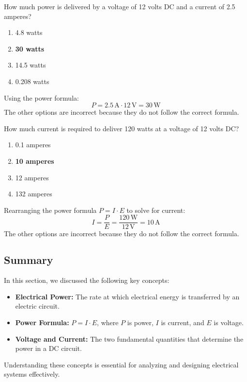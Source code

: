 
\begin{tcolorbox}[colback=gray!10!white,colframe=black!75!black,title={T5C10}]
    How much power is delivered by a voltage of 12 volts DC and a current of 2.5 amperes?
    \begin{enumerate}[label=\Alph*,noitemsep]
        \item 4.8 watts
        \item \textbf{30 watts}
        \item 14.5 watts
        \item 0.208 watts
    \end{enumerate}
\end{tcolorbox}
Using the power formula:
\[
P = 2.5 \, \text{A} \cdot 12 \, \text{V} = 30 \, \text{W}
\]
The other options are incorrect because they do not follow the correct formula.


\begin{tcolorbox}[colback=gray!10!white,colframe=black!75!black,title={T5C11}]
    How much current is required to deliver 120 watts at a voltage of 12 volts DC?
    \begin{enumerate}[label=\Alph*,noitemsep]
        \item 0.1 amperes
        \item \textbf{10 amperes}
        \item 12 amperes
        \item 132 amperes
    \end{enumerate}
\end{tcolorbox}
Rearranging the power formula \( P = I \cdot E \) to solve for current:
\[
I = \frac{P}{E} = \frac{120 \, \text{W}}{12 \, \text{V}} = 10 \, \text{A}
\]
The other options are incorrect because they do not follow the correct formula.


\subsection*{Summary}
In this section, we discussed the following key concepts:
\begin{itemize}
    \item \textbf{Electrical Power:} The rate at which electrical energy is transferred by an electric circuit.
    \item \textbf{Power Formula:} \( P = I \cdot E \), where \( P \) is power, \( I \) is current, and \( E \) is voltage.
    \item \textbf{Voltage and Current:} The two fundamental quantities that determine the power in a DC circuit.
\end{itemize}
Understanding these concepts is essential for analyzing and designing electrical systems effectively.
